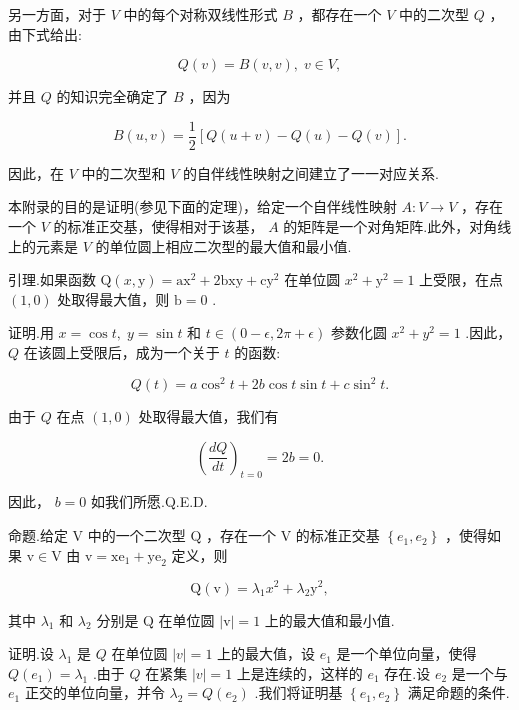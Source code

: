 另一方面，对于 \(V\) 中的每个对称双线性形式 \(B\) ，都存在一个 \(V\) 中的二次型 \(Q\) ，由下式给出:

\[
Q\left( v\right)  = B\left( {v,v}\right) ,\;v \in  V,
\]

并且 \(Q\) 的知识完全确定了 \(B\) ，因为

\[
B\left( {u,v}\right)  = \frac{1}{2}\left\lbrack  {Q\left( {u + v}\right)  - Q\left( u\right)  - Q\left( v\right) }\right\rbrack  .
\]

因此，在 \(V\) 中的二次型和 \(V\) 的自伴线性映射之间建立了一一对应关系.

本附录的目的是证明(参见下面的定理)，给定一个自伴线性映射 \(A : V \rightarrow  V\) ，存在一个 \(V\) 的标准正交基，使得相对于该基， \(A\) 的矩阵是一个对角矩阵.此外，对角线上的元素是 \(V\) 的单位圆上相应二次型的最大值和最小值.

引理.如果函数 \(\mathrm{Q}\left( {x,\mathrm{y}}\right)  = {\mathrm{{ax}}}^{2} + 2\mathrm{{bxy}} + {\mathrm{{cy}}}^{2}\) 在单位圆 \({x}^{2} + {\mathrm{y}}^{2} = 1\) 上受限，在点 \(\left( {1,0}\right)\) 处取得最大值，则 \(\mathrm{b} = 0\) .

证明.用 \(x = \cos t,\;y = \sin t\) 和 \(t \in  \left( {0 - \epsilon ,{2\pi } + \epsilon }\right)\) 参数化圆 \({x}^{2} + {y}^{2} = 1\) .因此， \(Q\) 在该圆上受限后，成为一个关于 \(t\) 的函数:

\[
Q\left( t\right)  = a{\cos }^{2}t + {2b}\cos t\sin t + c{\sin }^{2}t.
\]

由于 \(Q\) 在点 \(\left( {1,0}\right)\) 处取得最大值，我们有

\[
{\left( \frac{dQ}{dt}\right) }_{t = 0} = {2b} = 0.
\]

因此， \(b = 0\) 如我们所愿.Q.E.D.

命题.给定 \(\mathrm{V}\) 中的一个二次型 \(\mathrm{Q}\) ，存在一个 \(\mathrm{V}\) 的标准正交基 \(\left\{  {{e}_{1},{e}_{2}}\right\}\) ，使得如果 \(\mathrm{v} \in  \mathrm{V}\) 由 \(\mathrm{v} = {\mathrm{{xe}}}_{1} + {\mathrm{{ye}}}_{2}\) 定义，则

\[
\mathrm{Q}\left( \mathrm{v}\right)  = {\lambda }_{1}{x}^{2} + {\lambda }_{2}{\mathrm{y}}^{2},
\]

其中 \({\lambda }_{1}\) 和 \({\lambda }_{2}\) 分别是 \(\mathrm{Q}\) 在单位圆 \(\left| \mathrm{v}\right|  = 1\) 上的最大值和最小值.

证明.设 \({\lambda }_{1}\) 是 \(Q\) 在单位圆 \(\left| v\right|  = 1\) 上的最大值，设 \({e}_{1}\) 是一个单位向量，使得 \(Q\left( {e}_{1}\right)  = {\lambda }_{1}\) .由于 \(Q\) 在紧集 \(\left| v\right|  = 1\) 上是连续的，这样的 \({e}_{1}\) 存在.设 \({e}_{2}\) 是一个与 \({e}_{1}\) 正交的单位向量，并令 \({\lambda }_{2} = Q\left( {e}_{2}\right)\) .我们将证明基 \(\left\{  {{e}_{1},{e}_{2}}\right\}\) 满足命题的条件.

